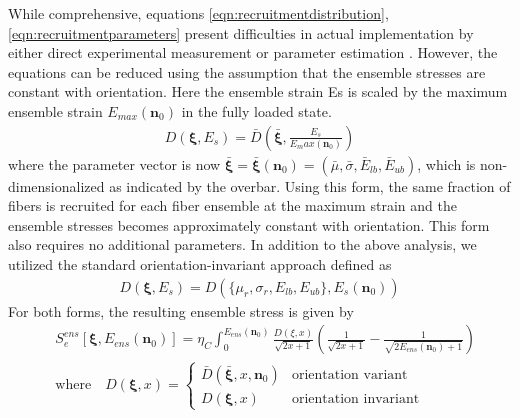     While comprehensive, equations \ref{eqn:recruitmentdistribution}, \ref{eqn:recruitmentparameters} present difficulties in actual implementation by either direct experimental measurement or parameter estimation \cite{hill_theoretical_2012}. However, the equations can be reduced using the assumption that the ensemble stresses are constant with orientation. Here the ensemble strain Es is scaled by the maximum ensemble strain $E_{max}(\mathbf{n}_0)$ in the fully loaded state.
        \begin{equation}\label{eqn:recruitmentasafunctionofangle}
        \begin{aligned}
        D(\mathbf{\xi},E_s) = \bar{D}\left(\bar{\mathbf{\xi}}, \frac{E_s}{E_max(\mathbf{n}_0)}\right)
        \end{aligned}
        \end{equation}
    where the parameter vector is now $\bar{\mathbf{\xi}} = \bar{\mathbf{\xi}}(\mathbf{n}_0) = (\bar{\mu}, \bar{\sigma}, \bar{E}_{lb}, \bar{E}_{ub})$, which is non-dimensionalized as indicated by the overbar. Using this form, the same fraction of fibers is recruited for each fiber ensemble at the maximum strain and the ensemble stresses becomes approximately constant with orientation. This form also requires no additional parameters. In addition to the above analysis, we utilized the standard orientation-invariant approach \cite{fata_insights_2014} defined as
        \begin{equation}\label{eqn:recruitmentasafunctionnormal}
        \begin{aligned}
        D(\mathbf{\xi},E_s) = D(\{\mu_r, \sigma_r, E_{lb}, E_{ub}\}, E_s(\mathbf{n}_0))
        \end{aligned}
        \end{equation}
    For both forms, the resulting ensemble stress is given by
        \begin{equation}\label{eqn:collagenensemblestress}
        \begin{aligned}
        &S_e^{ens}\left[ \mathbf{\xi}, E_{ens}(\mathbf{n}_0)\right] = 
            \eta_C \int_0^{E_{ens}(\mathbf{n}_0)} \frac{D(\xi,x)}{\sqrt{2x+1}} 
                \left(\frac{1}{\sqrt{2x+1}} - \frac{1}{\sqrt{2E_{ens}(\mathbf{n}_0)+1}}\right)  \\
        &\mathrm{where} \quad D(\mathbf{\xi}, x) = 
            \begin{cases} 
                \bar{D}(\bar{\mathbf{\xi}},x,\mathbf{n}_0) & \text{orientation variant} \\
                D(\mathbf{\xi},x) & \text{orientation invariant} 
            \end{cases}
        \end{aligned}
        \end{equation}
